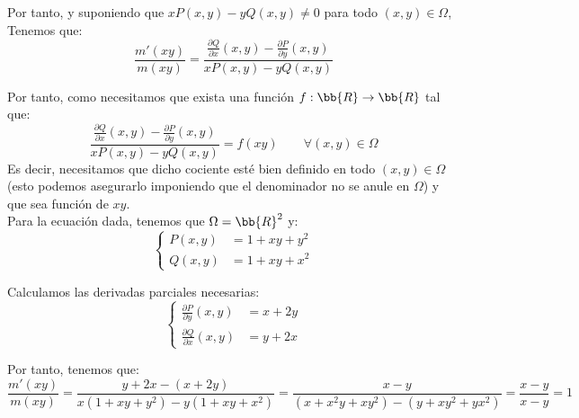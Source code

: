 \begin{ejercicio}
    Por tanto, y suponiendo que $xP(x,y)-yQ(x,y)\neq 0$ para todo $(x,y)\in\Omega$, Tenemos que:
    \begin{equation*}
        \dfrac{m'(xy)}{m(xy)} = \dfrac{\frac{\partial Q}{\partial x}(x,y)-\frac{\partial P}{\partial y}(x,y)}{xP(x,y)-yQ(x,y)}
    \end{equation*}

    Por tanto, como necesitamos que exista una función $f:\bb{R}\to\bb{R}$ tal que:
    \begin{equation*}
        \dfrac{\frac{\partial Q}{\partial x}(x,y)-\frac{\partial P}{\partial y}(x,y)}{xP(x,y)-yQ(x,y)} = f(xy)\qquad \forall (x,y)\in\Omega
    \end{equation*}
    Es decir, necesitamos que dicho cociente esté bien definido en todo $(x,y)\in\Omega$ (esto podemos asegurarlo imponiendo que el denominador no se anule en $\Omega$) y que sea función de $xy$.\\

    Para la ecuación dada, tenemos que $\Omega=\bb{R}^2$ y:
    \begin{equation*}
        \left\{
            \begin{aligned}
                P(x,y) &= 1+xy+y^2\\
                Q(x,y) &= 1+xy+x^2
            \end{aligned}
        \right.
    \end{equation*}

    Calculamos las derivadas parciales necesarias:
    \begin{equation*}
        \left\{
            \begin{aligned}
                \frac{\partial P}{\partial y}(x,y) &= x+2y\\
                \frac{\partial Q}{\partial x}(x,y) &= y+2x
            \end{aligned}
        \right.
    \end{equation*}

    Por tanto, tenemos que:
    \begin{equation*}
        \dfrac{m'(xy)}{m(xy)} = \dfrac{y+2x-(x+2y)}{x(1+xy+y^2)-y(1+xy+x^2)} = \dfrac{x-y}{(x+x^2y+xy^2)-(y+xy^2+yx^2)} = \dfrac{x-y}{x-y} = 1
    \end{equation*}


\end{ejercicio}
